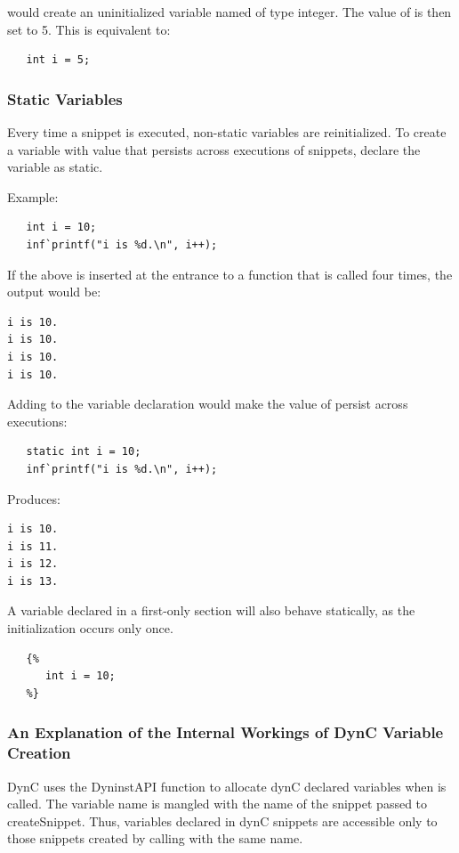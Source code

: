 \noindent would create an uninitialized variable named  of type integer.
The value of  is then set to 5.  This is equivalent to:

\begin{lstlisting}
   int i = 5;
\end{lstlisting}

\subsubsection{Static Variables}

Every time a snippet is executed, non-static variables are reinitialized. To create a variable with value that persists across executions of snippets, declare the variable as static.

\noindent Example:
\begin{lstlisting}
   int i = 10;
   inf`printf("i is %d.\n", i++);
\end{lstlisting}

\noindent If the above is inserted at the entrance to a function that is called four times, the output would be:

\begin{lstlisting}
i is 10.
i is 10.
i is 10.
i is 10.
\end{lstlisting}

\noindent Adding  to the variable declaration would make the value of  persist across executions:
\begin{lstlisting}
   static int i = 10;
   inf`printf("i is %d.\n", i++);
\end{lstlisting}
\noindent Produces:
\begin{lstlisting}
i is 10.
i is 11.
i is 12.
i is 13.
\end{lstlisting}

\noindent A variable declared in a first-only section will also behave statically, as the initialization occurs only once.

\begin{lstlisting}
   {%
      int i = 10;
   %}
\end{lstlisting}

\subsubsection{An Explanation of the Internal Workings of DynC Variable Creation}
\label{sec:varExplain}

DynC uses the DyninstAPI function  to allocate dynC declared
variables when  is called. The variable name is mangled
with the name of the snippet passed to createSnippet. Thus, variables declared
in dynC snippets are accessible only to those snippets created by calling
 with the same name.

